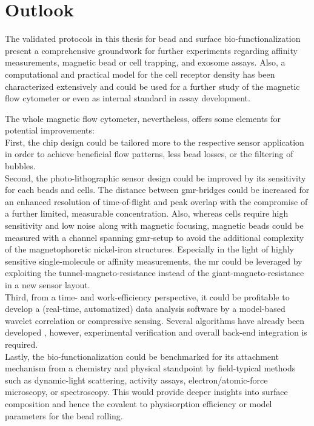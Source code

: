 \chapter{Outlook}
The validated protocols in this thesis for bead and surface bio-functionalization present a comprehensive groundwork for further experiments regarding affinity measurements, magnetic bead or cell trapping, and exosome assays. Also, a computational and practical model for the cell receptor density has been characterized extensively and could be used for a further study of the magnetic flow cytometer or even as internal standard in assay development. 

The whole magnetic flow cytometer, nevertheless, offers some elements for potential improvements: \\
First, the chip design could be tailored more to the respective sensor application in order to achieve beneficial flow patterns, less bead losses, or the filtering of bubbles.\\
Second, the photo-lithographic sensor design could be improved by its sensitivity for each beads and cells. The distance between \gls{gmr}-bridges could be increased for an enhanced resolution of time-of-flight and peak overlap with the compromise of a further limited, measurable concentration. Also, whereas cells require high sensitivity and low noise along with magnetic focusing, magnetic beads could be measured with a channel spanning \gls{gmr}-setup to avoid the additional complexity of the magnetophoretic nickel-iron structures. Especially in the light of highly sensitive single-molecule or affinity measurements, the \acrlong{mr} could be leveraged by exploiting the tunnel-magneto-resistance instead of the giant-magneto-resistance in a new sensor layout.\cite{lit:GMRTMR}\\
Third, from a time- and work-efficiency perspective, it could be profitable to develop a (real-time, automatized) data analysis software by a model-based wavelet correlation or compressive sensing. Several algorithms have already been developed \cite{lit:thes:michaelBauer}, however, experimental verification and overall back-end integration is required.\\
Lastly, the bio-functionalization could be benchmarked for its attachment mechanism from a chemistry and physical standpoint by field-typical methods such as dynamic-light scattering, activity assays, electron/atomic-force microscopy, or spectroscopy. This would provide deeper insights into surface composition and hence the covalent to physisorption efficiency or model parameters for the bead rolling.\\
